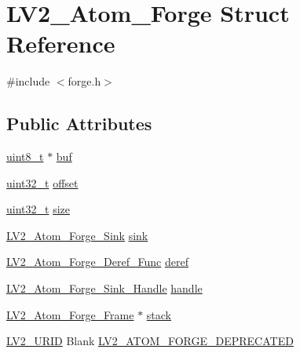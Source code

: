 \hypertarget{struct_l_v2___atom___forge}{}\section{L\+V2\+\_\+\+Atom\+\_\+\+Forge Struct Reference}
\label{struct_l_v2___atom___forge}


{\ttfamily \#include $<$forge.\+h$>$}

\subsection*{Public Attributes}
\begin{DoxyCompactItemize}
\item 
\hyperlink{lib-src_2ffmpeg_2win32_2stdint_8h_a9a941819355e6f658991890ff66b4b0e}{uint8\+\_\+t} $\ast$ \hyperlink{struct_l_v2___atom___forge_ab6236f0f581165cf959188212cf98860}{buf}
\item 
\hyperlink{lib-src_2ffmpeg_2win32_2stdint_8h_a6eb1e68cc391dd753bc8ce896dbb8315}{uint32\+\_\+t} \hyperlink{struct_l_v2___atom___forge_ae729e5f2aa15b926622091df5edb1e2c}{offset}
\item 
\hyperlink{lib-src_2ffmpeg_2win32_2stdint_8h_a6eb1e68cc391dd753bc8ce896dbb8315}{uint32\+\_\+t} \hyperlink{struct_l_v2___atom___forge_a25e51f11cd8055598ba53e8622c68b74}{size}
\item 
\hyperlink{forge_8h_a613887c9f1f3d5ebd94b49eaf7cc6f94}{L\+V2\+\_\+\+Atom\+\_\+\+Forge\+\_\+\+Sink} \hyperlink{struct_l_v2___atom___forge_a5c86ff2977c7b68800a91ec29bbf64af}{sink}
\item 
\hyperlink{forge_8h_ac5c410365728df8fbb2dbf0c15421b1a}{L\+V2\+\_\+\+Atom\+\_\+\+Forge\+\_\+\+Deref\+\_\+\+Func} \hyperlink{struct_l_v2___atom___forge_a8de4639169c21d3eb417163eefa3f812}{deref}
\item 
\hyperlink{forge_8h_a19874fcf063508aa5069ee22fd494676}{L\+V2\+\_\+\+Atom\+\_\+\+Forge\+\_\+\+Sink\+\_\+\+Handle} \hyperlink{struct_l_v2___atom___forge_a953cf7ee1d8a4793ad0a3b95aaf2e0cd}{handle}
\item 
\hyperlink{forge_8h_a17754ac32fadfa54b73978e8a535065b}{L\+V2\+\_\+\+Atom\+\_\+\+Forge\+\_\+\+Frame} $\ast$ \hyperlink{struct_l_v2___atom___forge_a8d1567f516b51cd49e2dd0b1b5285ab7}{stack}
\item 
\hyperlink{urid_8h_a5ff0630d245539e9f6dca10ff3c40fae}{L\+V2\+\_\+\+U\+R\+ID} Blank \hyperlink{struct_l_v2___atom___forge_a641cb7eb7ab7fb6e8cda5b349b6d60a8}{L\+V2\+\_\+\+A\+T\+O\+M\+\_\+\+F\+O\+R\+G\+E\+\_\+\+D\+E\+P\+R\+E\+C\+A\+T\+ED}

\end{DoxyCompactItemize}
